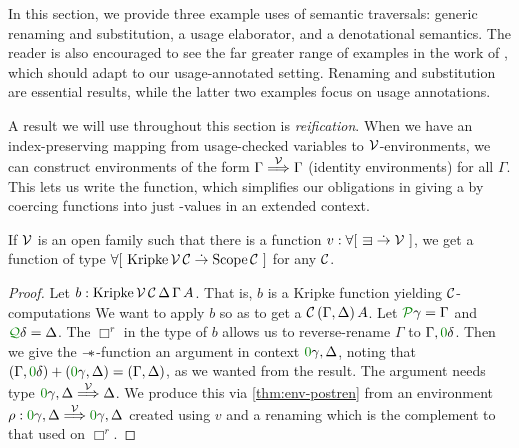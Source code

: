 In this section, we provide three example uses of semantic traversals: generic
renaming and substitution, a usage elaborator, and a denotational semantics.
The reader is also encouraged to see the far greater range of examples in the
work of \citet{AACMM21}, which should adapt to our usage-annotated setting.
Renaming and substitution are essential results, while the latter two examples
focus on usage annotations.

A result we will use throughout this section is \emph{reification}.
When we have an index-preserving mapping from usage-checked variables to
$\mathcal V$-environments, we can construct environments of the form
$\Gamma \stackrel{\mathcal V}\Longrightarrow \Gamma$ (identity environments) for all $\Gamma$.
This lets us write the  function, which  simplifies our
obligations in giving a  by coercing
 functions into just
\AgdaBound{$\C$}-values in an extended context.



\begin{lemma}\label{thm:reify}
  If $\mathcal V$ is an open family such that there is a function
  $v : \forallb{{\sqni} \dotto \V}$, we get a function of type
  $\forallb{\mathrm{Kripke}\,\V\,\C \dotto \mathrm{Scope}\,\C}$ for any $\C$.
\end{lemma}
\begin{proof}
  Let $b : \mathrm{Kripke}\,\mathcal V\,\mathcal C\,\Delta\,\Gamma\,A$.
  That is, $b$ is a Kripke function yielding $\C$-computations
  We want to apply $b$ so as to get a $\C\,\plr{\Gamma, \Delta}\,A$.
  Let $\grP\gamma = \Gamma$ and $\grQ\delta = \Delta$.
  The $\Box^r$ in the type of $b$ allows us to reverse-rename $\Gamma$ to
  $\Gamma, \gr0\delta$.
  Then we give the $\mathrel{\mathord{-}\hspace{-0.75ex}*}$-function an argument in context
  $\gr0\gamma, \Delta$, noting that
  $\plr{\Gamma, \gr0\delta} + \plr{\gr0\gamma, \Delta} = \plr{\Gamma, \Delta}$,
  as we wanted from the result.
  The argument needs type $\gr0\gamma, \Delta \env\V \Delta$.
  We produce this via \cref{thm:env-postren} from an environment
  $\rho : \gr0\gamma, \Delta \env\V \gr0\gamma, \Delta$ created using $v$
  and a renaming which is the complement to that used on $\Box^r$.
\end{proof}

